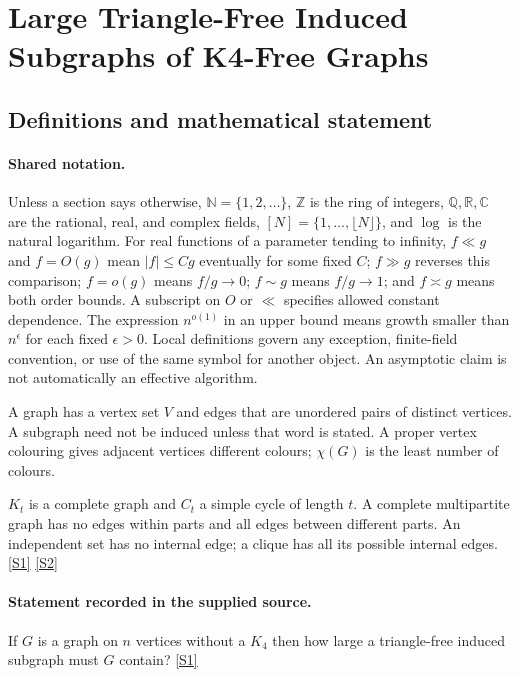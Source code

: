 \documentclass[11pt,a4paper]{article}
\newcommand{\N}{\mathbb{N}}
\newcommand{\Z}{\mathbb{Z}}
\newcommand{\Q}{\mathbb{Q}}
\newcommand{\R}{\mathbb{R}}
\newcommand{\C}{\mathbb{C}}
\newcommand{\sref}[2]{\hyperlink{source:#1:#2}{[S#2]}}
\begin{document}
\section{Large Triangle-Free Induced Subgraphs of K4-Free Graphs}\label{statement}


\subsection{Definitions and mathematical statement}

\paragraph{Shared notation.}Unless a section says otherwise, $\N=\{1,2,\ldots\}$,
$\Z$ is the ring of integers, $\Q,\R,\C$ are the rational, real, and complex
fields, $[N]=\{1,\ldots,\lfloor N\rfloor\}$, and $\log$ is the natural
logarithm. For real functions of a parameter tending to infinity,
$f\ll g$ and $f=O(g)$ mean $|f|\leq Cg$ eventually for some fixed $C$;
$f\gg g$ reverses this comparison; $f=o(g)$ means $f/g\to0$;
$f\sim g$ means $f/g\to1$; and $f\asymp g$ means both order bounds.
A subscript on $O$ or $\ll$ specifies allowed constant dependence.
The expression $n^{o(1)}$ in an upper bound means growth smaller than
$n^\epsilon$ for each fixed $\epsilon>0$. Local definitions govern any
exception, finite-field convention, or use of the same symbol for another
object. An asymptotic claim is not automatically an effective algorithm.



A graph has a vertex set $V$ and edges that are unordered pairs of distinct vertices. A subgraph need not be induced unless that word is stated. A proper vertex colouring gives adjacent vertices different colours; $\chi(G)$ is the least number of colours.

$K_t$ is a complete graph and $C_t$ a simple cycle of length $t$. A complete multipartite graph has no edges within parts and all edges between different parts. An independent set has no internal edge; a clique has all its possible internal edges. \sref{statement}{1} \sref{statement}{2}

\paragraph{Statement recorded in the supplied source.}
If $G$ is a graph on $n$ vertices without a $K_4$ then how large a triangle-free induced subgraph must $G$ contain? \sref{statement}{1}
\end{document}
